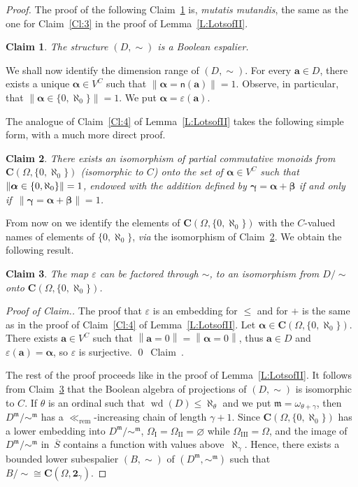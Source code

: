 \documentclass[psamsfonts,reqno]{memo-l}
\theoremstyle{plain}
\newtheorem{claim}{Claim}
\theoremstyle{definition}
\theoremstyle{remark}
\newcommand{\qedc}{{\qed}~{\rm Claim~{\theclaim}.}}
\newenvironment{cproof}
{\begin{proof}[Proof of Claim.]}
{\qedc\renewcommand{\qed}{}\end{proof}}
\numberwithin{equation}{section}
\DeclareMathOperator{\wdt}{wd}
\newcommand{\two}{\mathbf{2}}
\newcommand{\eps}{\varepsilon}
\renewcommand{\iff}{if and only if}
\newcommand{\ol}[1]{\,\overline{\!#1}}
\newcommand{\es}{\varnothing}
\newcommand{\rem}{\ll_{\mathrm{rem}}}
\newcommand{\CC}{\mathbf{C}}
\newcommand{\nn}{\mathsf{n}}
\newcommand{\fm}{\mathfrak{m}}
\newcommand{\la}{\boldsymbol{a}}
\newcommand{\lga}{\boldsymbol{\alpha}}
\newcommand{\lgb}{\boldsymbol{\beta}}
\newcommand{\lgc}{\boldsymbol{\gamma}}
\newcommand{\bv}[1]{\left\|#1\right\|}
\newcommand{\I}{\mathrm{I}}
\newcommand{\II}{\mathrm{II}}
\newcommand{\III}{\mathrm{III}}
\newcommand{\pup}[1]{\textup{(}{#1}\textup{)}}
\newcommand{\pcm}{partial commutative mon\-oid}
\newcommand{\set}[1]{\{#1\}}
\begin{document}
\begin{proof}
The proof of the following Claim~\ref{Cl:2b} is, \emph{mutatis
mutandis}, the same as the one for Claim~\ref{Cl:3} in the
proof of Lemma~\ref{L:LotsofII}.

\begin{claim}\label{Cl:2b}
The structure $(D,\sim)$ is a Boolean espalier.
\end{claim}

We shall now identify the dimension range of
$(D,\sim)$. For every
$\la\in D$, there exists a unique $\lga\in V^C$ such that
$\bv{\lga=\nn(\la)}=1$. Observe, in particular, that
$\bv{\lga\in\set{0,\aleph_0}}=1$. We put $\lga=\eps(\la)$.

The analogue of Claim~\ref{Cl:4} of Lemma~\ref{L:LotsofII} takes the
following simple form, with a much more direct proof.

\begin{claim}\label{Cl:3b}
There exists an isomorphism of \pcm s from
$\CC(\Omega,\set{0,\aleph_0})$
\pup{isomorphic to $C$} onto the set of $\lga\in V^C$
such that
$\bv{\lga\in\set{0,\aleph_0}}=\nobreak1$, endowed with the addition defined by
$\lgc=\lga+\lgb$ \iff\ $\bv{\lgc=\lga+\lgb}=1$.
\end{claim}

{}From now on we identify the elements of $\CC(\Omega,\set{0,\aleph_0})$ with
the $C$-valued names of elements of $\set{0,\aleph_0}$, \emph{via} the
isomorphism of Claim~\ref{Cl:3b}. We obtain the following result.

\begin{claim}\label{Cl:4b}
The map $\eps$ can be factored through $\sim$, to an isomorphism from
$D/{\sim}$ onto $\CC(\Omega,\set{0,\aleph_0})$.
\end{claim}

\begin{cproof}
The proof that $\eps$ is an embedding for $\leq$ and for $+$ is the same as
in the proof of Claim~\ref{Cl:4} of Lemma~\ref{L:LotsofII}.
Let $\lga\in\CC(\Omega,\set{0,\aleph_0})$. There exists
$\la\in V^C$ such that $\bv{\la=0}=\bv{\lga=0}$, thus
$\la\in D$ and $\eps(\la)=\lga$, so
$\eps$ is surjective.
\end{cproof}

The rest of the proof proceeds like in the proof of Lemma~\ref{L:LotsofII}.
It follows from Claim~\ref{Cl:4b} that the Boolean algebra
 of projections of
$(D,\sim)$ is isomorphic to $C$.
If $\theta$ is an ordinal such that $\wdt(D)\leq\aleph_\theta$ and we put
$\fm=\omega_{\theta+\gamma}$, then $D^\fm/{\sim^\fm}$ has a $\rem$-increasing
chain of length $\gamma+1$. Since $\CC(\Omega,\set{0,\aleph_0})$ has a lower
embedding into $D^\fm/{\sim^\fm}$,
$\Omega_{\I}=\Omega_{\II}=\es$ while
$\Omega_{\III}=\Omega$, and the image of $D^\fm/{\sim^\fm}$ in $\ol{S}$
contains a function with values above~$\aleph_\gamma$. Hence, there exists a
bounded lower subespalier
$(B,\sim)$ of $(D^\fm,\sim^\fm)$ such that
$B/{\sim}\cong\CC(\Omega,\two_\gamma)$.
\index{Tzzgamma@$\two_\gamma$}
\end{proof}
\end{document}
